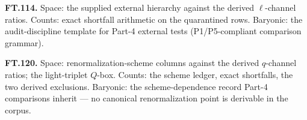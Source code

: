 \textbf{FT.114.} Space: the supplied external hierarchy against the derived $\ell$-channel ratios. Counts: exact shortfall arithmetic on the quarantined rows. Baryonic: the audit-discipline template for Part-4 external tests (P1/P5-compliant comparison grammar).

\textbf{FT.120.} Space: renormalization-scheme columns against the derived $q$-channel ratios; the light-triplet $Q$-box. Counts: the scheme ledger, exact shortfalls, the two derived exclusions. Baryonic: the scheme-dependence record Part-4 comparisons inherit — no canonical renormalization point is derivable in the corpus.

